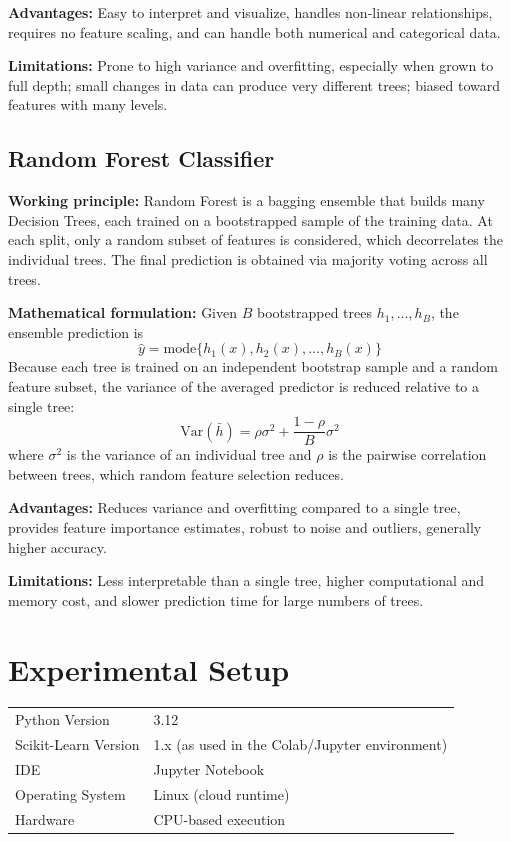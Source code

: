 \documentclass[12pt,a4paper]{article}
\begin{document}
\textbf{Advantages:} Easy to interpret and visualize, handles non-linear relationships,
requires no feature scaling, and can handle both numerical and categorical data.

\textbf{Limitations:} Prone to high variance and overfitting, especially when grown to full
depth; small changes in data can produce very different trees; biased toward features with
many levels.

\subsection*{Random Forest Classifier}
\textbf{Working principle:} Random Forest is a bagging ensemble that builds many Decision
Trees, each trained on a bootstrapped sample of the training data. At each split, only a
random subset of features is considered, which decorrelates the individual trees. The final
prediction is obtained via majority voting across all trees.

\textbf{Mathematical formulation:} Given $B$ bootstrapped trees $h_1, \dots, h_B$, the
ensemble prediction is
\begin{equation}
\hat{y} = \text{mode}\{h_1(x), h_2(x), \dots, h_B(x)\}
\end{equation}
Because each tree is trained on an independent bootstrap sample and a random feature subset,
the variance of the averaged predictor is reduced relative to a single tree:
\begin{equation}
\text{Var}(\bar{h}) = \rho\sigma^2 + \frac{1-\rho}{B}\sigma^2
\end{equation}
where $\sigma^2$ is the variance of an individual tree and $\rho$ is the pairwise correlation
between trees, which random feature selection reduces.

\textbf{Advantages:} Reduces variance and overfitting compared to a single tree, provides
feature importance estimates, robust to noise and outliers, generally higher accuracy.

\textbf{Limitations:} Less interpretable than a single tree, higher computational and memory
cost, and slower prediction time for large numbers of trees.

\section{Experimental Setup}
\begin{tabular}{ll}
\toprule
Python Version & 3.12 \\
Scikit-Learn Version & 1.x (as used in the Colab/Jupyter environment) \\
IDE & Jupyter Notebook \\
Operating System & Linux (cloud runtime) \\
Hardware & CPU-based execution \\
\bottomrule
\end{tabular}
\end{document}
